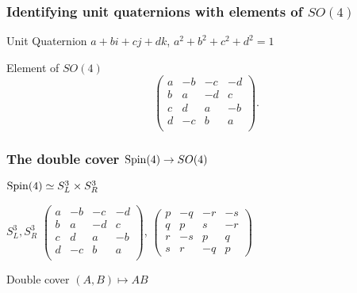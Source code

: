 \documentclass{beamer}
\def\Spin{{\rm Spin}}
\begin{document}
\begin{frame}
	\frametitle{Identifying unit quaternions with elements of  $SO(4)$}
	\begin{block}{Unit Quaternion}
	$a + bi + cj + dk$, $a^2 + b^2 + c^2 + d^2 = 1$
	\end{block}
	\begin{block}{Element of $SO(4)$}
	\[
\left(
\begin{array}{cccc}
a & -b & -c & -d \\
b & a & -d & c \\
c & d & a & -b \\
d & -c & b & a \\
\end{array}
\right).
\]
	\end{block}
\end{frame}

\begin{frame}
	\frametitle{The double cover $\Spin(4) \rightarrow SO(4)$}
	\begin{block}{$\Spin(4) \simeq S^3_L \times S^3_R$}
	\end{block}
	\begin{block}{$S^3_L, S^3_R$}
$\left(
\begin{array}{cccc}
a & -b & -c & -d \\
b & a & -d & c \\
c & d & a & -b \\
d & -c & b & a \\
\end{array}
\right)$, $\left(
\begin{array}{cccc}
p & -q & -r & -s \\
q & p & s & -r \\
r & -s & p & q \\
s & r & -q & p
\end{array}
\right)$	
	\end{block}
	\begin{block}{Double cover}
	$(A,B) \mapsto AB$
	\end{block}
\end{frame}
\end{document}
